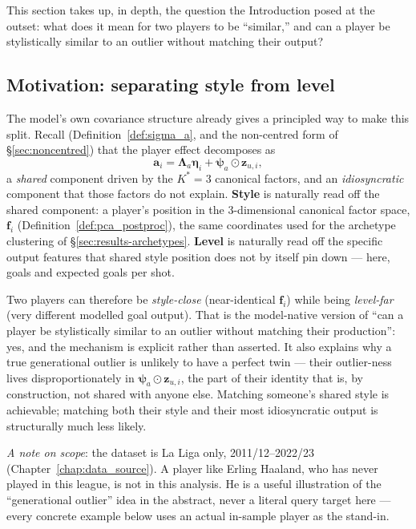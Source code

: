 This section takes up, in depth, the question the Introduction posed at the outset: what does it mean for two
players to be ``similar,'' and can a player be stylistically similar to an outlier without matching their
output?

\subsection{Motivation: separating style from level}

The model's own covariance structure already gives a principled way to make this split. Recall
(Definition~\ref{def:sigma_a}, and the non-centred form of \S\ref{sec:noncentred}) that the player effect
decomposes as
\[
\mathbf a_i = \boldsymbol\Lambda_a\boldsymbol\eta_i + \boldsymbol\psi_a \odot \mathbf z_{u,i},
\]
a \emph{shared} component driven by the $K^*=3$ canonical factors, and an \emph{idiosyncratic} component that
those factors do not explain. \textbf{Style} is naturally read off the shared component: a player's position in
the $3$-dimensional canonical factor space, $\mathbf f_i$ (Definition~\ref{def:pca_postproc}), the same
coordinates used for the archetype clustering of \S\ref{sec:results-archetypes}. \textbf{Level} is naturally
read off the specific output features that shared style position does not by itself pin down --- here, goals
and expected goals per shot.

Two players can therefore be \emph{style-close} (near-identical $\mathbf f_i$) while being \emph{level-far}
(very different modelled goal output). That is the model-native version of ``can a player be stylistically
similar to an outlier without matching their production'': yes, and the mechanism is explicit rather than
asserted. It also explains why a true generational outlier is unlikely to have a perfect twin --- their
outlier-ness lives disproportionately in $\boldsymbol\psi_a \odot \mathbf z_{u,i}$, the part of their identity
that is, by construction, not shared with anyone else. Matching someone's shared style is achievable; matching
both their style and their most idiosyncratic output is structurally much less likely.

\emph{A note on scope}: the dataset is La Liga only, 2011/12--2022/23 (Chapter~\ref{chap:data_source}). A player like
Erling Haaland, who has never played in this league, is not in this analysis. He is a useful illustration of
the ``generational outlier'' idea in the abstract, never a literal query target here --- every concrete example
below uses an actual in-sample player as the stand-in.

